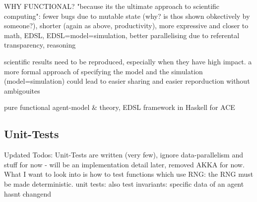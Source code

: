 WHY FUNCTIONAL? "because its the ultimate approach to scientific computing": fewer bugs due to mutable state (why? is thos shown obkectively by someone?), shorter (again as above, productivity), more expressive and closer to math, EDSL, EDSL=model=simulation, better parallelising due to referental transparency, reasoning

scientific results need to be reproduced, especially when they have high impact. a more formal approach of specifying the model and the simulation (model=simulation) could lead to easier sharing and easier reporduction without ambigouites

pure functional agent-model \& theory, EDSL framework in Haskell for ACE

\subsection*{Unit-Tests}
Updated Todos: Unit-Tests are written (very few), ignore data-parallelism and stuff for now - will be an implementation detail later, removed AKKA for now. What I want to look into is how to test functions which use RNG: the RNG must be made deterministic.
unit tests: also test invariants: specific data of an agent hasnt changend


